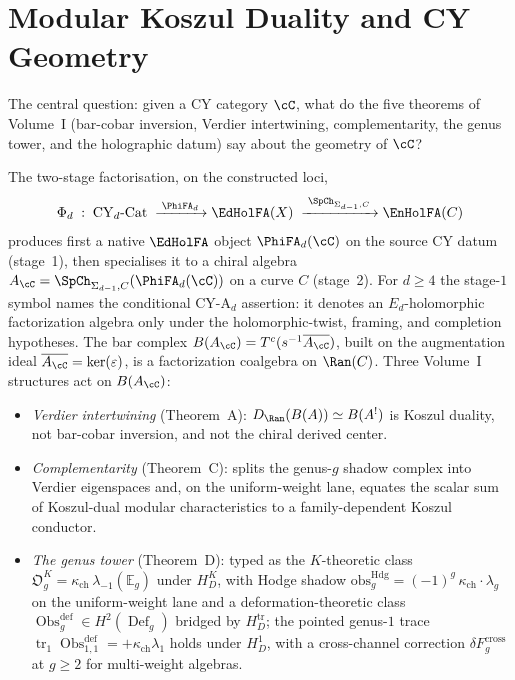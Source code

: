 \chapter{Modular Koszul Duality and CY Geometry}
\label{ch:modular-koszul-bridge}

The central question: given a CY category $\cC$, what do the five theorems of Volume~I (bar-cobar inversion, Verdier intertwining, complementarity, the genus tower, and the holographic datum) say about the geometry of $\cC$?

The two-stage factorisation, on the constructed loci,
\[
 \Phi_d \;:\; \mathrm{CY}_d\text{-}\mathrm{Cat}
 \;\xrightarrow{\;\PhiFA_d\;}
 \EdHolFA(X)
 \;\xrightarrow{\;\SpCh_{\Sigma_{d-1},C}\;}
 \EnHolFA(C)
\]
produces first a native $\EdHolFA$ object $\PhiFA_d(\cC)$ on the source
CY datum (stage~1), then specialises it to a chiral algebra
$A_\cC = \SpCh_{\Sigma_{d-1},C}(\PhiFA_d(\cC))$ on a curve $C$
(stage~2). For $d\geq4$ the stage-$1$ symbol names the conditional
CY-A$_d$ assertion: it denotes an $E_d$-holomorphic factorization
algebra only under the holomorphic-twist, framing, and completion
hypotheses. The bar complex
$B(A_\cC) = T^c(s^{-1}\overline{A_\cC})$, built on the augmentation
ideal $\overline{A_\cC} = \ker(\varepsilon)$, is a factorization
coalgebra on $\Ran(C)$. Three Volume~I structures act on $B(A_\cC)$:
\begin{itemize}
 \item \emph{Verdier intertwining} (Theorem~A): $D_{\Ran}(B(A)) \simeq B(A^!)$ is Koszul duality, not bar-cobar inversion, and not the chiral derived center.
 \item \emph{Complementarity} (Theorem~C): splits the genus-$g$ shadow complex into Verdier eigenspaces and, on the uniform-weight lane, equates the scalar sum of Koszul-dual modular characteristics to a family-dependent Koszul conductor.
 \item \emph{The genus tower} (Theorem~D): typed as the $K$-theoretic class $\mathfrak O_g^K = \kappa_{\mathrm{ch}}\,\lambda_{-1}(\mathbb E_g)$ under $H_D^K$, with Hodge shadow $\mathrm{obs}_g^{\mathrm{Hdg}} = (-1)^g\,\kappa_{\mathrm{ch}}\cdot\lambda_g$ on the uniform-weight lane and a deformation-theoretic class $\operatorname{Obs}^{\mathrm{def}}_g \in H^2(\operatorname{Def}_g)$ bridged by $H_D^{\mathrm{tr}}$; the pointed genus-$1$ trace $\operatorname{tr}_1\operatorname{Obs}^{\mathrm{def}}_{1,1} = +\kappa_{\mathrm{ch}}\lambda_1$ holds under $H_D^1$, with a cross-channel correction $\delta F_g^{\mathrm{cross}}$ at $g \geq 2$ for multi-weight algebras.
\end{itemize}

